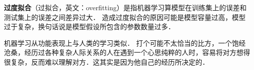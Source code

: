 
\textbf{过度拟合}（过拟合，英文：overfitting）是指机器学习算模型在训练集上的误差和测试集上的误差之间差异过大．
造成过度拟合的原因可能是模型容量过高，模型过于复杂，换句话说是模型假设所包含的参数数量过多．

机器学习从功能表现上与人类的学习类似．
打个可能不太恰当的比方，一个饱经沧桑，经历过各种复杂人际关系的人在遇到一个心思纯粹的人时，容易将对方想得很复杂，反而难以理解对方．这其实是因为他自己的经历所决定的．